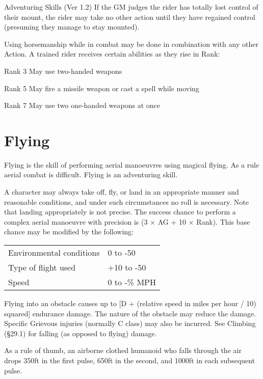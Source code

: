 \begin{Chapter}{Adventuring Skills (Ver 1.2)}
If the GM judges the rider has totally lost control of their mount,
the rider may take no other action until they have regained control
(presuming they manage to stay mounted).

Using horsemanship while in combat may be done in combination with any
other Action.  A trained rider receives certain abilities as they rise
in Rank:

\begin{Description}

\item[Rank 3] May use two-handed weapons
  
\item [Rank 5]May fire a missile weapon or cast a spell while moving

\item [Rank 7] May use two one-handed weapons at once

\end{Description}

\section{Flying}

Flying is the skill of performing aerial manoeuvres using magical
flying.  As a rule aerial combat is difficult. Flying is an
adventuring skill.

A character may always take off, fly, or land in an appropriate manner
and reasonable conditions, and under such circumstances no roll is
necessary. Note that landing appropriately is not precise.  The
success chance to perform a complex aerial manoeuvre with precision is
(3 × AG + 10 × Rank).  This base chance may be modified by the
following:

\begin{tabularx}{\linewidth}{Xl}
Environmental conditions	& 0 to -50 \\
Type of flight used		& +10 to -50 \\
Speed				& 0 to -\% MPH \\
\end{tabularx}

Flying into an obstacle causes up to [D + (relative speed in miles per
  hour / 10) squared] endurance damage. The nature of the obstacle may
reduce the damage.  Specific Grievous injuries (normally C class) may
also be incurred.  See Climbing (§29.1) for falling (as opposed to
flying) damage.

As a rule of thumb, an airborne clothed humanoid who falls through the
air drops 350ft in the first pulse, 650ft in the second, and 1000ft in
each subsequent pulse.


\end{Chapter}
